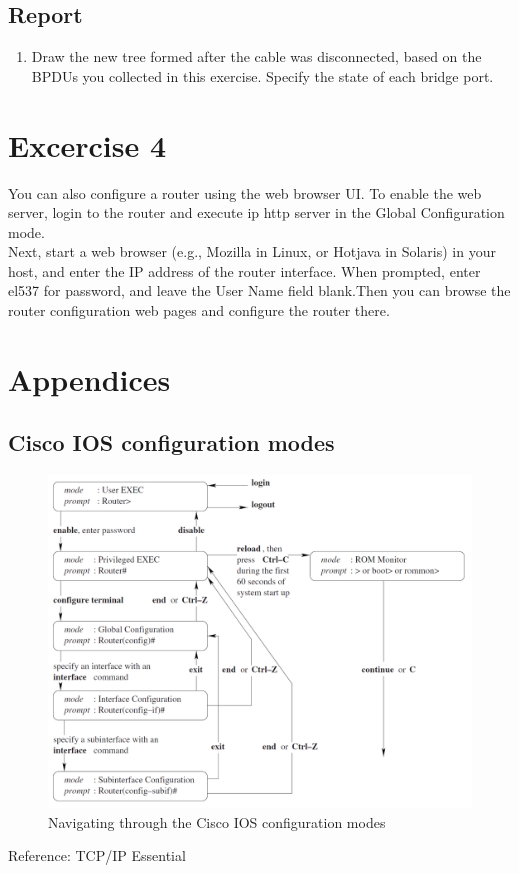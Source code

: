 \documentclass[10pt,a4paper]{article}
\numberwithin{equation}{section}
\numberwithin{figure}{section}
\numberwithin{table}{section}
\begin{document}
    \subsection*{Report}
    \begin{enumerate}
        \item Draw the new tree formed after the cable was disconnected, based on the BPDUs you collected in this exercise. Specify the state of each bridge port. 
    \end{enumerate}

\section*{Excercise 4}
 You can also configure a router using the web browser UI. To enable the web server, login to the router and execute ip http server in the Global Configuration mode. \\
Next, start a web browser (e.g., Mozilla in Linux, or Hotjava in Solaris) in your host, and enter the IP address of the router interface. When prompted, enter el537 for password, and leave the User Name field blank.Then you can browse the router configuration web pages and configure the router there. 
\fi

\appendix
\section*{Appendices}
\renewcommand{\thesubsection}{\Alph{subsection}}

\subsection{Cisco IOS configuration modes}
\begin{figure}[H]
    \centering
    \includegraphics[width=\textwidth]{img/appendix-ios.png}
    \caption{Navigating through the Cisco IOS configuration modes}
\end{figure}
Reference: TCP/IP Essential
\end{document}
